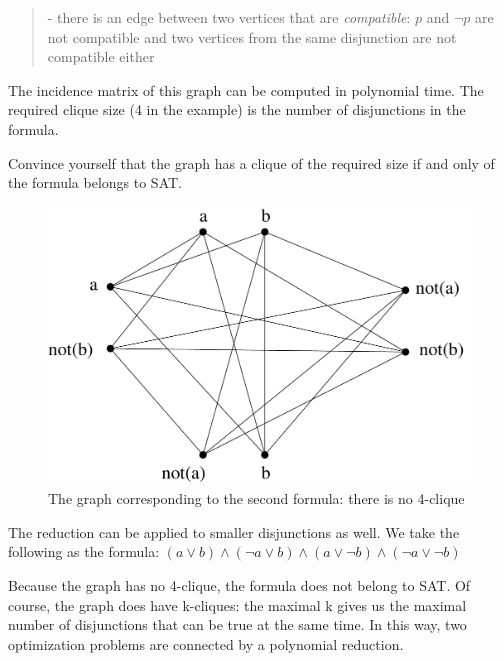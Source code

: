 {\begin{example}
\begin{verse}
- there is an edge between two vertices that are {\em compatible}: $p$
and $\neg p$ are not compatible and two vertices from the same
disjunction are not compatible either
\end{verse}

The incidence matrix of this graph can be computed in polynomial
time. The required clique size (4 in the example) is the number of
disjunctions in the formula.
\end{example}

Convince yourself that the graph has a clique of the required size if
and only of the formula belongs to SAT.

\begin{figure}[h]
\begin{center}
\includegraphics[height=0.2\textheight,keepaspectratio]{satclique2}
\caption{The graph corresponding to the second formula: there is no
4-clique}\label{satclique2}
\end{center}
\end{figure}

\begin{example}
The reduction can be applied to smaller disjunctions as well. We take the following
as the formula: $(a \vee b) \wedge (\neg a \vee b) \wedge (a \vee \neg b)
\wedge (\neg a \vee \neg b)$

Because the graph has no 4-clique, the formula does not belong to
SAT. Of course, the graph does have k-cliques: the maximal k gives us
the maximal number of disjunctions that can be true at the same
time. In this way, two optimization problems are connected by a
polynomial reduction.

\end{example}


}
